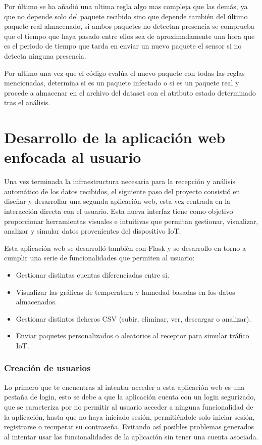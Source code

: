 Por último se ha añadió una ultima regla algo mas compleja que las demás, ya que no depende solo del paquete recibido sino que depende también del último paquete real almacenado, si ambos paquetes no detectan presencia se comprueba que el tiempo que haya pasado entre ellos sea de aproximadamente una hora que es el periodo de tiempo que tarda en enviar un nuevo paquete el sensor si no detecta ninguna presencia.


Por ultimo una vez que el código evalúa el nuevo paquete con todas las reglas mencionadas, determina si es un paquete infectado o si es un paquete real y procede a almacenar en el archivo del dataset con el atributo estado determinado tras el análisis.


\section{Desarrollo de la aplicación web enfocada al usuario }

Una vez terminada la infraestructura necesaria para la recepción y análisis automático de los datos recibidos, el siguiente paso del proyecto consistió en diseñar y desarrollar una segunda aplicación web, esta vez centrada en la interacción directa con el usuario. Esta nueva interfaz tiene como objetivo proporcionar herramientas visuales e intuitivas que permitan gestionar, visualizar, analizar y simular datos provenientes del dispositivo IoT.

Esta aplicación web se desarrolló también con Flask y se desarrollo en torno a cumplir una serie de funcionalidades que permiten al usuario:

\begin{itemize}
    \item Gestionar distintas cuentas diferenciadas entre si.
    \item Visualizar las gráficas de temperatura y humedad basadas en los datos almacenados.
    \item Gestionar distintos ficheros CSV (subir, eliminar, ver, descargar o analizar).
    \item Enviar paquetes personalizados o aleatorios al receptor para simular tráfico IoT.
\end{itemize}


\subsubsection{Creación de usuarios}
Lo primero que te encuentras al intentar acceder a esta aplicación web es una pestaña de login, esto se debe a que la aplicación cuenta con un login segurizado, que se caracteriza por no permitir al usuario acceder a ninguna funcionalidad de la aplicación, hasta que no haya iniciado sesión, permitiéndole solo iniciar sesión, registrarse o recuperar su contraseña. Evitando así posibles problemas generados al intentar usar las funcionalidades de la aplicación sin tener una cuenta asociada.  

